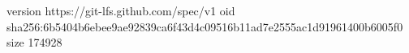 version https://git-lfs.github.com/spec/v1
oid sha256:6b5404b6ebee9ae92839ca6f43d4c09516b11ad7e2555ac1d91961400b6005f0
size 174928
